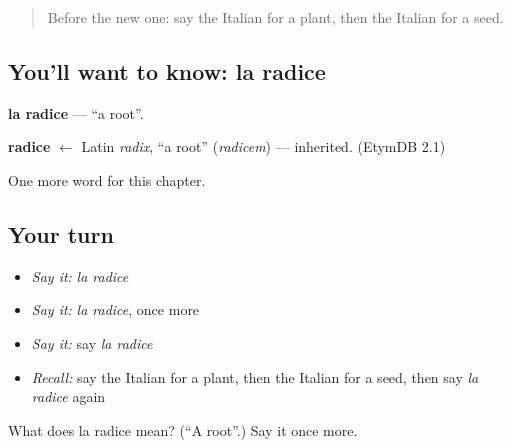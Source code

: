 \label{lesson:IT-C168-radice}



\begin{quote}
Before the new one: say the Italian for a plant, then the Italian for a seed.
\end{quote}

\subsection*{You'll want to know: la radice}
\textbf{la radice} — \textquotedblleft{}a root\textquotedblright{}.

\begin{cousinweb}
\textbf{radice} $\leftarrow$ Latin \emph{radix}, \textquotedblleft{}a root\textquotedblright{} (\emph{radicem}) — inherited. (EtymDB 2.1)
\end{cousinweb}

\begin{grammarlens}[title={What you've built}]
One more word for this chapter.
\end{grammarlens}

\subsection*{Your turn}
\begin{itemize}
\raggedright
  \item \emph{Say it:} \emph{la radice}
  \item \emph{Say it:} \emph{la radice}, once more
  \item \emph{Say it:} say \emph{la radice}
  \item \emph{Recall:} say the Italian for a plant, then the Italian for a seed, then say \emph{la radice} again
\end{itemize}

\begin{tcolorbox}[breakable,colback=teal!4,colframe=teal!35!black,title={Before you move on}]
What does la radice mean? (\textquotedblleft{}A root\textquotedblright{}.) Say it once more.
\end{tcolorbox}
